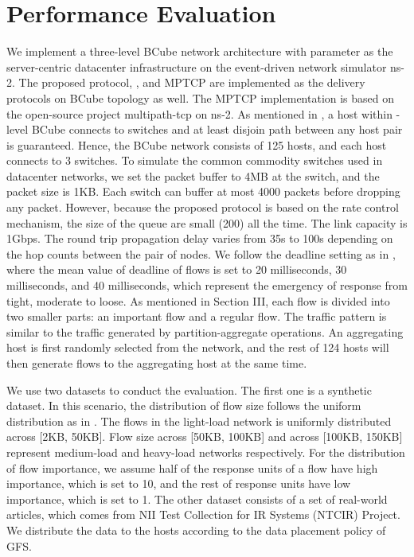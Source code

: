 \documentclass[conference]{IEEEtran}
\begin{document}
\section{Performance Evaluation}

We implement a three-level BCube network architecture\cite{bcube} with parameter  as the server-centric datacenter infrastructure on the event-driven network simulator ns-2\cite{ns2}. The proposed protocol, \cite{deadline}, and MPTCP\cite{mptcp} are implemented as the delivery protocols on BCube topology as well. The MPTCP implementation is based on the open-source project multipath-tcp on ns-2\cite{mptcpns2}. As mentioned in \cite{bcube}, a host within -level BCube connects to  switches and at least  disjoin path between any host pair is guaranteed. Hence, the BCube network consists of 125 hosts, and each host connects to 3 switches. To simulate the common commodity switches used in datacenter networks, we set the packet buffer to 4MB at the switch, and the packet size is 1KB. Each switch can buffer at most 4000 packets before dropping any packet. However, because the proposed protocol is based on the rate control mechanism, the size of the queue are small (200) all the time. The link capacity is 1Gbps. The round trip propagation delay varies from 35s to 100s depending on the hop counts between the pair of nodes. We follow the deadline setting as in \cite{deadline}, where the mean value of deadline of flows is set to 20 milliseconds, 30 milliseconds, and 40 milliseconds, which represent the emergency of response from tight, moderate to loose. As mentioned in Section III, each flow is divided into two smaller parts: an important flow and a regular flow. The traffic pattern is similar to the traffic generated by partition-aggregate operations. An aggregating host is first randomly selected from the network, and the rest of 124 hosts will then generate flows to the aggregating host at the same time.

We use two datasets to conduct the evaluation. The first one is a synthetic dataset. In this scenario, the distribution of flow size follows the uniform distribution as in \cite{deadline}. The flows in the light-load network is uniformly distributed across [2KB, 50KB]. Flow size across [50KB, 100KB] and across [100KB, 150KB] represent medium-load and heavy-load networks respectively. For the distribution of flow importance, we assume half of the response units of a flow have high importance, which is set to 10, and the rest of response units have low importance, which is set to 1. The other dataset consists of a set of real-world articles, which comes from NII Test Collection for IR Systems (NTCIR) Project\cite{ntcir}. We distribute the data to the hosts according to the data placement policy of GFS\cite{gfs}.
\end{document}

